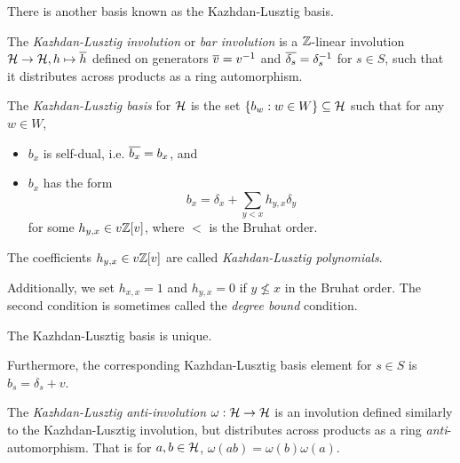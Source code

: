 
There is another basis known as the Kazhdan-Lusztig basis.

\begin{definition}
    The \textit{Kazhdan-Lusztig involution} or \textit{bar involution} is a $\mathbb{Z}$-linear involution $\mathcal{H} \to \mathcal{H}, h \mapsto \overline{h}$ defined on generators $\overline{v} = v^{-1}$ and $\overline{\delta_s} = \delta_s^{-1}$ for $s \in S$, such that it distributes across products as a ring automorphism.
\end{definition}


\begin{definition}
    The \textit{Kazhdan-Lusztig basis} for $\mathcal{H}$ is the set $\{b_w : w \in W\} \subseteq \mathcal{H}$ such that for any $w \in W$,
    \begin{itemize}
        \item $b_x$ is self-dual, i.e. $\overline{b_x} = b_x$, and
        \item $b_x$ has the form
              \[
                  b_x = \delta_x + \sum_{y<x} h_{y,x} \delta_y
              \]
              for some $h_{y,x} \in v\mathbb{Z}[v]$, where $<$ is the Bruhat order.
    \end{itemize}
    The coefficients $h_{y,x} \in v\mathbb{Z}[v]$ are called \textit{Kazhdan-Lusztig polynomials}.
\end{definition}

Additionally, we set $h_{x,x} = 1$ and $h_{y,x} = 0$ if $y \not\leq x$ in the Bruhat order. The second condition is sometimes called the \textit{degree bound} condition.

\begin{lemma}
    The Kazhdan-Lusztig basis is unique.
\end{lemma}

Furthermore, the corresponding Kazhdan-Lusztig basis element for $s \in S$ is $b_s = \delta_s + v$.


\begin{definition}
    The \textit{Kazhdan-Lusztig anti-involution} $\omega: \mathcal{H} \to \mathcal{H}$ is an involution defined similarly to the Kazhdan-Lusztig involution, but distributes across products as a ring \textit{anti}-automorphism. That is for $a,b \in \mathcal{H}$, $\omega(ab) = \omega(b) \omega(a)$.
\end{definition}

